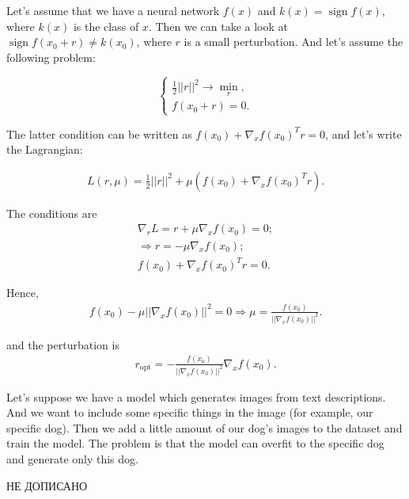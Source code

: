 \begin{eexl}
    Let's assume that we have a neural network $f(x)$ and $k(x) = \operatorname{sign} f(x)$, where $k(x)$ is the class of $x$. Then we can take a look at $\operatorname{sign} f(x_0 + r) \neq k(x_0)$, where $r$ is a small perturbation. And let's assume the following problem: 

    \begin{equation*}
        \begin{cases}
            \frac{1}{2} ||r||^2 \to \min_r, \\  
            f(x_0 + r) = 0.
        \end{cases}
    \end{equation*}

    The latter condition can be written as $f(x_0) + \nabla_x f(x_0)^T r = 0$, and let's write the Lagrangian:
    
    \begin{equation*}
        \begin{aligned}
            L(r, \mu) = \frac{1}{2} ||r||^2 + \mu (f(x_0) + \nabla_x f(x_0)^T r).
        \end{aligned}
    \end{equation*}

    The conditions are
    \begin{equation*}
        \begin{aligned}
            \nabla_r L = r + \mu \nabla_x f(x_0) = 0; \\ 
            \Rightarrow r = -\mu \nabla_x f(x_0); \\
            f(x_0) + \nabla_x f(x_0)^T r = 0.
        \end{aligned}
    \end{equation*}

    Hence, 
    \begin{equation*}
        \begin{aligned}
            f(x_0) - \mu ||\nabla_x f(x_0)||^2 = 0 \Rightarrow \mu = \frac{f(x_0)}{||\nabla_x f(x_0)||^2}.
        \end{aligned}
    \end{equation*}

    and the perturbation is
    \begin{equation*}
        \begin{aligned}
            r_{\operatorname{opt}} = -\frac{f(x_0)}{||\nabla_x f(x_0)||^2} \nabla_x f(x_0).
        \end{aligned}
    \end{equation*}
\end{eexl}

\begin{eexl}
    Let's suppose we have a model which generates images from text descriptions. And we want to include some specific things in the image (for example, our specific dog). Then we add a little amount of our dog's images to the dataset and train the model. The problem is that the model can overfit to the specific dog and generate only this dog.
\end{eexl}

НЕ ДОПИСАНО